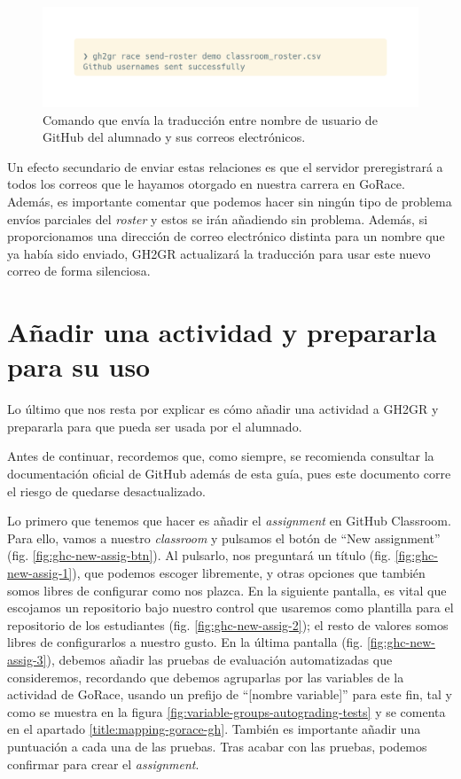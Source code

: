 \begin{figure}
    \centering
    \includegraphics[width=0.5\linewidth]{images/client-send-roaster.png}
    \caption{Comando que envía la traducción entre nombre de usuario de GitHub del alumnado y sus correos electrónicos.}
\end{figure}

Un efecto secundario de enviar estas relaciones es que el servidor preregistrará a todos los correos que le hayamos otorgado en nuestra carrera en GoRace. Además, es importante comentar que podemos hacer sin ningún tipo de problema envíos parciales del \textit{roster} y estos se irán añadiendo sin problema. Además, si proporcionamos una dirección de correo electrónico distinta para un nombre que ya había sido enviado, GH2GR actualizará la traducción para usar este nuevo correo de forma silenciosa.

\section{Añadir una actividad y prepararla para su uso}

Lo último que nos resta por explicar es cómo añadir una actividad a GH2GR y prepararla para que pueda ser usada por el alumnado.

Antes de continuar, recordemos que, como siempre, se recomienda consultar la documentación oficial de GitHub además de esta guía, pues este documento corre el riesgo de quedarse desactualizado.

Lo primero que tenemos que hacer es añadir el \textit{assignment} en GitHub Classroom. Para ello, vamos a nuestro \textit{classroom} y pulsamos el botón de ``New assignment'' (fig. \ref{fig:ghc-new-assig-btn}). Al pulsarlo, nos preguntará un título (fig. \ref{fig:ghc-new-assig-1}), que podemos escoger libremente, y otras opciones que también somos libres de configurar como nos plazca. En la siguiente pantalla, es vital que escojamos un repositorio bajo nuestro control que usaremos como plantilla para el repositorio de los estudiantes (fig. \ref{fig:ghc-new-assig-2}); el resto de valores somos libres de configurarlos a nuestro gusto. En la última pantalla (fig. \ref{fig:ghc-new-assig-3}), debemos añadir las pruebas de evaluación automatizadas que consideremos, recordando que debemos agruparlas por las variables de la actividad de GoRace, usando un prefijo de ``[nombre variable]'' para este fin, tal y como se muestra en la figura \ref{fig:variable-groups-autograding-tests} y se comenta en el apartado \ref{title:mapping-gorace-gh}. También es importante añadir una puntuación a cada una de las pruebas. Tras acabar con las pruebas, podemos confirmar para crear el \textit{assignment}.

